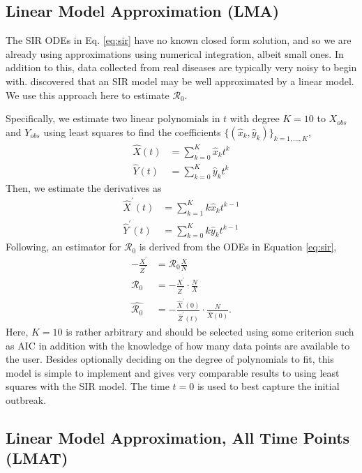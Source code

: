 \documentclass[12pt]{article}
\newcommand{\rr}{\ensuremath{\mathcal{R}_0}}
\begin{document}
\subsection{Linear Model Approximation (LMA)}\label{linear-model-approximation-degree-10}

The SIR ODEs in Eq. \ref{eq:sir} have no known closed form solution, and so we are already using approximations using numerical integration, albeit small ones.  In addition to this, data collected from real diseases are typically very noisy to begin with.  \cite{chang2017} discovered that an SIR model may be well approximated by a linear model.  We use this approach here to estimate $\rr$.

Specifically, we estimate two linear polynomials in \(t\) with degree \(K= 10\) to \(X_{obs}\)
and \(Y_{obs}\) using least squares to find the coefficients $\{(\hat{x}_k,
\hat{y}_k)\}_{k=1, \dots, K}$,
\begin{align*}
\hat{X}(t) &= \sum_{k=0}^K \hat{x}_k t^k\\
{\hat{Y}}(t) &= \sum_{k=0}^K \hat{y}_k t^k
\end{align*}
Then, we estimate the derivatives as
\begin{align*}
\hat{X}^\prime(t) &= \sum_{k=1}^K k \hat{x}_k t^{k-1}\\
\hat{Y}^\prime(t) &= \sum_{k=0}^K k \hat{y}_k t^{k-1}
\end{align*}
Following,  an estimator for \(\rr\) is derived from the ODEs in Equation \eqref{eq:sir},
\begin{align}
  - \frac{X^\prime}{Z^\prime}&= \rr \frac{X}{N} \nonumber\\
  \rr &=       -\frac{X^\prime}{
        Z^\prime} \cdot \frac{N}{X} \nonumber\\
  \hat{\rr} &= -\frac{\hat{X}^\prime(0)}{ \hat{Z}^\prime(t)} \cdot \frac{N}{\hat{X}(0)}. \nonumber
  \end{align}
Here, $K=10$ is rather arbitrary and should be selected using some criterion such as AIC in addition with the knowledge of how many data points are available to the user.  Besides optionally deciding on the degree of polynomials to fit, this model is simple to implement and gives very comparable results to using least squares with the SIR model.  The time $t=0$ is used to best capture the initial outbreak. 

\subsection{Linear Model Approximation, All Time Points (LMAT)}\label{linear-model-approximation-all-time-points-degree-10}
\end{document}
